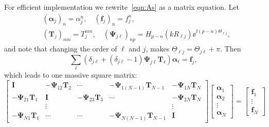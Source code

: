 \documentclass[ 12pt, a4paper]{article}
\renewcommand{\vec}[1]{\boldsymbol{#1}}
\begin{document}
For efficient implementation we rewrite~\eqref{eqn:As} as a matrix equation. Let
\begin{align}
  &(\vec \alpha_j)_n =  \alpha_j^n, \quad (\vec f_j)_n =  f_j^n,
  \\
  &(\vec T_j)_{nm} = T^{nm}_j, \quad (\vec \Psi_{j \ell})_{np} =  H_{p-n}(k R_{\ell j})\ee^{\ii(p-n)\Theta_{\ell j}},
\end{align}
and note that changing the order of $\ell$ and $j$, makes $\Theta_{\ell j} = \Theta_{j \ell } + \pi$. Then
\begin{equation}
 \sum_{\ell}(\delta_{j \ell} +  (\delta_{j \ell}-1) \vec \Psi_{j \ell} \vec T_\ell) \vec \alpha_\ell  =  \vec f_j,
\end{equation}
which leads to one massive square matrix:
\begin{equation}
  \begin{bmatrix}
    \vec I & - \vec \Psi_{1 2}\vec T_2 & \cdots & - \vec \Psi_{1 (N-1)} \vec T_{N-1} & - \vec \Psi_{1 N} \vec T_N \\
    - \vec \Psi_{2 1} \vec T_1 & \vec I &  - \vec \Psi_{2 3} \vec T_3 & \cdots & - \vec \Psi_{2 N} \vec T_N \\
     & \vdots & & & \vdots \\
     - \vec \Psi_{N 1} \vec T_1  & \cdots & \cdots & -  \vec \Psi_{N (N-1)} \vec T_{N-1} & \vec I
  \end{bmatrix}
  \begin{bmatrix}
    \vec \alpha_1 \\
    \vec \alpha_2 \\
    \vdots \\
    \vec \alpha_N
  \end{bmatrix}
   = \begin{bmatrix}
     \vec f_1 \\
     \vdots \\
     \vec f_N
   \end{bmatrix}
\end{equation}


\printbibliography
\end{document}
